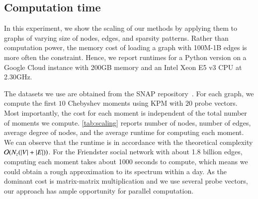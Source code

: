 \subsection{Computation time}

In this experiment, we show the scaling of our methods by applying them to
graphs of varying size of nodes, edges, and sparsity patterns. Rather than
computation power, the memory cost of loading a graph with 100M-1B edges is more
often the constraint. Hence, we report runtimes for a Python version on a Google
Cloud instance with 200GB memory and an Intel Xeon E5 v3 CPU at 2.30GHz.

The datasets we use are obtained from the SNAP repository~\cite{snapnets}. For
each graph, we compute the first $10$ Chebyshev moments using KPM with $20$
probe vectors. Most importantly, the cost for each moment is independent of the
total number of moments we compute. \cref{tab:scaling} reports number of
nodes, number of edges, average degree of nodes, and the average runtime for
computing each moment. We can observe that the runtime is in accordance with
the theoretical complexity $\mathcal{O}(N_z(\left\lvert V\right\rvert + \left\lvert E\right\rvert))$. For the Friendster
social network with about 1.8 billion edges, computing each moment takes about
1000 seconds to compute, which means we could obtain a rough approximation to
its spectrum within a day. As the dominant cost is matrix-matrix multiplication
and we use several probe vectors, our approach has ample opportunity for
parallel computation.
